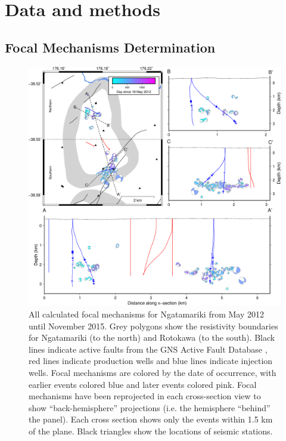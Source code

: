 
\section{Data and methods}
\subsection{Focal Mechanisms Determination}

\begin{figure}[h!]
\begin{center}
\includegraphics[width=1.00\columnwidth]{Chapter_5_FMs/figures/merc_Nga_GC_focmecs/merc_Nga_GC_focmecs_original}
\caption{{All calculated focal mechanisms for Ngatamariki from May 2012 until
November 2015. Grey polygons show the resistivity boundaries for
Ngatamariki (to the north) and Rotokawa (to the south). Black lines
indicate active faults from the GNS Active Fault Database \citep{AFDB}, red lines indicate production wells and
blue lines indicate injection wells. Focal mechanisms are colored by the
date of occurrence, with earlier events colored blue and later events
colored pink. Focal mechanisms have been reprojected in each
cross-section view to show ``back-hemisphere'' projections (i.e. the
hemisphere ``behind'' the panel). Each cross section shows only the
events within 1.5 km of the plane. Black triangles show the locations of
seismic stations.
{\label{542095}}%
}}
\end{center}
\end{figure}


